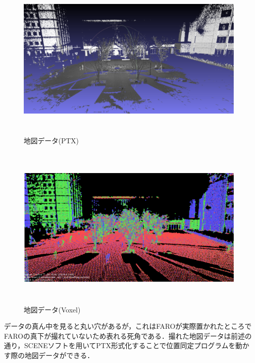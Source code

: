 \begin{figure}[htbp]
  \begin{center}
   \includegraphics[height=80mm]{figure/地図データ(PTX).eps}
   \caption{地図データ(PTX)}
   \label{地図データ(PTX)}
  \end{center}
\end{figure}

\begin{figure}[htbp]
  \begin{center}
   \includegraphics[height=80mm]{figure/地図データ(Voxel).eps}
   \caption{地図データ(Voxel)}
   \label{地図データ(Voxel)}
  \end{center}
\end{figure}

\vspace{15mm}
データの真ん中を見ると丸い穴があるが，これはFAROが実際置かれたところでFAROの真下が撮れていないため表れる死角である．撮れた地図データは前述の通り，SCENEソフトを用いてPTX形式化することで位置同定プログラムを動かす際の地図データができる．

